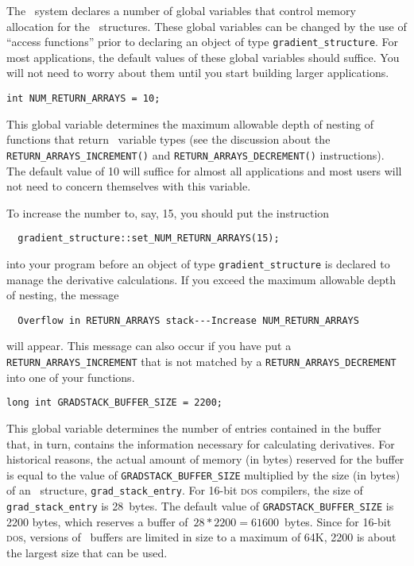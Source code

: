 \documentclass{admbmanual}
\begin{document}
The \scAD\ system declares a number of global variables that control memory
allocation for the \scAD\ structures. These global variables can be changed by
the use of ``access functions'' prior to declaring an object of type
\texttt{gradient\_structure}. For most applications, the default values of these
global variables should suffice. You will not need to worry about them until you
start building larger applications.

\bigskip
{}
\begin{lstlisting}
int NUM_RETURN_ARRAYS = 10;
\end{lstlisting}
This global variable determines the maximum allowable depth of nesting of
functions that return \scAD\ variable types (see the discussion about the
\texttt{RETURN\_ARRAYS\_INCREMENT()} and \texttt{RETURN\_ARRAYS\_DECREMENT()}
instructions). The default value of 10 will suffice for almost all applications
and most users will not need to concern themselves with this variable.

To increase the number to, say, 15, you should put the instruction
\begin{lstlisting}
  gradient_structure::set_NUM_RETURN_ARRAYS(15);
\end{lstlisting}
into your program before an object of type \texttt{gradient\_structure} is
declared to manage the derivative calculations. If you exceed the maximum
allowable depth of nesting, the message
\begin{lstlisting}
  Overflow in RETURN_ARRAYS stack---Increase NUM_RETURN_ARRAYS
\end{lstlisting}
will appear. This message can also occur if you have put a
\texttt{RETURN\_ARRAYS\_INCREMENT} that is not matched by a
\texttt{RETURN\_ARRAYS\_DECREMENT} into one of your functions.

\bigskip
{}
\begin{lstlisting}
long int GRADSTACK_BUFFER_SIZE = 2200;
\end{lstlisting}
This global variable determines the number of entries contained in the buffer
that, in turn, contains the information necessary for calculating derivatives.
For historical reasons, the actual amount of memory (in bytes) reserved for the
buffer is equal to the value of \texttt{GRADSTACK\_BUFFER\_SIZE} multiplied by
the size (in bytes) of an \scAD\ structure, \texttt{grad\_\-stack\_\-entry}. For
16-bit \textsc{dos} compilers, the size of \texttt{grad\_stack\_entry} is
28~bytes. The default value of \texttt{GRADSTACK\_BUFFER\_SIZE} is 2200 bytes,
which reserves a buffer of~$28*2200=61600$~bytes. Since for 16-bit \textsc{dos},
versions of \scAD\ buffers are limited in size to a maximum of 64K, 2200 is
about the largest size that can be used.
\end{document}
